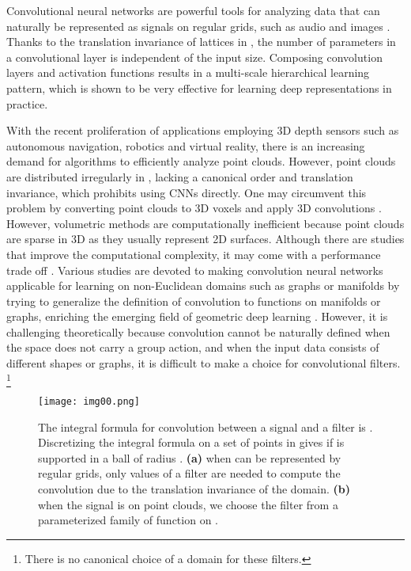 \documentclass[runningheads]{llncs}
\begin{document}
Convolutional neural networks are powerful tools for analyzing data that can naturally be represented as signals on regular grids, such as audio and images \cite{krizhevsky2012imagenet}. Thanks to the translation invariance of lattices in , the number of parameters in a convolutional layer is independent of the input size. Composing convolution layers and activation functions results in a multi-scale hierarchical learning pattern, which is shown to be very effective for learning deep representations in practice. 

With the recent proliferation of applications employing 3D depth sensors \cite{zhang2012microsoft} such as autonomous navigation, robotics and virtual reality, there is an increasing  demand for algorithms to efficiently analyze point clouds. 
However, point clouds are distributed irregularly in , lacking a canonical order and translation invariance, which prohibits using CNNs directly. One may circumvent this problem by converting point clouds to 3D voxels and apply 3D convolutions \cite{maturana2015voxnet}. However, volumetric methods are computationally inefficient because point clouds are sparse in 3D as they usually represent 2D surfaces. Although there are studies that improve the computational complexity, it may come with a performance trade off \cite{riegler2017octnet} \cite{brock2016generative}. Various studies are devoted to making convolution neural networks applicable for learning on non-Euclidean domains such as graphs or manifolds by trying to generalize the definition of convolution to functions on manifolds or graphs, enriching the emerging field of geometric deep learning \cite{bronstein2017geometric}. However, it is challenging theoretically because convolution cannot be naturally defined when the space does not carry a group action, and when the input data consists of different shapes or graphs, it is difficult to make a choice for convolutional filters.
\footnote{There is no canonical choice of a domain for these filters.}

\begin{figure}
\centering
\texttt{[image: img00.png]}
\caption{ 
The integral formula for convolution between a signal  and a filter  is . Discretizing the integral formula on a set of points  in   gives  if  is supported in a ball of radius .
{\bf (a)} when  can be represented by regular grids, only  values of a filter  are needed to compute the convolution due to the translation invariance of the domain.
{\bf (b)} when the signal is on point clouds, we choose the filter  from a parameterized family of function on .
}
\label{fig:spiderConv}
\end{figure}
\end{document}
